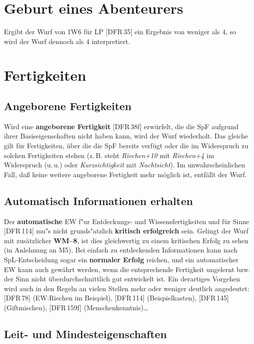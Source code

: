 \documentclass[10pt,a4paper,germanpar]{article}
\begin{document}
\section{Geburt eines Abenteurers}

Ergibt der Wurf von 1W6 für LP [DFR\,35] ein Ergebnis von weniger als
4, so wird der Wurf dennoch als 4 interpretiert.

\section{Fertigkeiten}

\subsection{Angeborene Fertigkeiten}

Wird eine \textbf{angeborene Fertigkeit} [DFR\,38f] erwürfelt, die die
SpF aufgrund ihrer Basiseigenschaften nicht haben kann, wird der Wurf
wiederholt. Das gleiche gilt für Fertigkeiten, über die die SpF
bereits verfügt oder die im Widerspruch zu solchen Fertigkeiten stehen
(z.\,B. steht \emph{Riechen+10} mit \emph{Riechen+4} im Widerspruch
(u.\,u.) oder \emph{Kurzsichtigkeit} mit \emph{Nachtsicht}). Im
unwahrscheinlichen Fall, daß keine weitere angeborene Fertigkeit mehr
möglich ist, entfällt der Wurf.

\subsection{Automatisch Informationen erhalten}

Der \textbf{automatische} EW f"ur Entdeckungs- und Wissensfertigkeiten
und für Sinne [DFR\,114] mu"s nicht grunds"atzlich \textbf{kritisch
  erfolgreich} sein. Gelingt der Wurf mit zusätzlicher \textbf{WM--8},
ist dies gleichwertig zu einem kritischen Erfolg zu sehen (in
Anlehnung an M5). Bei einfach zu entdeckenden Informationen kann nach
SpL-Ent\-schei\-dung sogar ein \textbf{normaler Erfolg} reichen, und
ein automatischer EW kann auch gewährt werden, wenn die entsprechende
Fertigkeit ungelernt bzw. der Sinn nicht überdurchschnittlich gut
entwickelt ist. Ein derartiges Vorgehen wird auch in den Regeln an
vielen Stellen mehr oder weniger deutlich angedeutet: [DFR\,78]
(EW:Riechen im Beispiel), [DFR\,114] (Beispielkasten), [DFR\,145]
(Giftmischen), [DFR\,159f] (Menschenkenntnis)\dots

\subsection{Leit- und Mindesteigenschaften}
\end{document}
